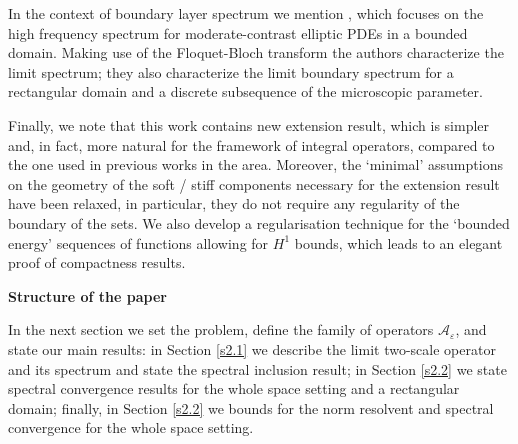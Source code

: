 \documentclass[11pt]{article}
\newcommand\e {\varepsilon}
\newcommand\A{\mathcal A}
\theoremstyle{remark}
\begin{document}





In the context of boundary layer spectrum we mention \cite{AlCo1998}, which focuses on the high frequency spectrum  for moderate-contrast elliptic PDEs in a bounded domain.
Making use of the Floquet-Bloch transform  the authors characterize the limit spectrum; they also characterize the limit boundary spectrum for a rectangular domain and a discrete subsequence of the microscopic parameter.

Finally, we note that this work contains new extension result, which is simpler and, in fact, more natural for the framework of integral operators, compared to the one used in previous works in the area. Moreover, the `minimal' assumptions on the geometry of the soft / stiff components necessary for the extension result have been relaxed, in particular, they do not require any regularity of the boundary of the sets. We also develop a regularisation technique for the `bounded energy' sequences of functions allowing for $H^1$ bounds, which leads to an elegant proof of compactness results.



{\bf Structure of the paper}

In the next section we set the problem, define the family of operators $\A_\e$, and state our main results: in Section \ref{s2.1} we describe the limit two-scale operator and its spectrum and state the spectral inclusion result; in Section \ref{s2.2} we state spectral convergence results for the whole space setting and a rectangular domain; finally, in Section \ref{s2.2} we bounds for the norm resolvent and spectral convergence for the whole space setting.
\end{document}
